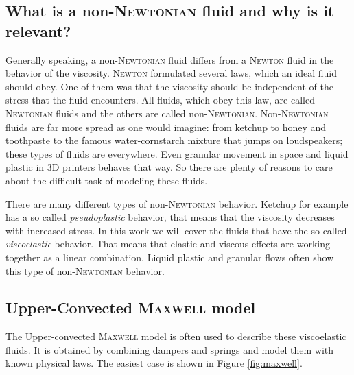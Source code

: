 \documentclass[12pt,a4paper,twoside, open=right]{scrreprt}
\theoremstyle{definition}
\theoremstyle{plain}
\begin{document}
\subsection{What is a non-\textsc{Newtonian} fluid and why is it relevant?}
Generally speaking, a non-\textsc{Newtonian} fluid differs from a \textsc{Newton} fluid in the behavior of the viscosity. \textsc{Newton} formulated several laws, which an ideal fluid should obey. One of them was that the viscosity should be independent of the stress that the fluid encounters. All fluids, which obey this law, are called \textsc{Newtonian} fluids and the others are called non-\textsc{Newtonian}. Non-\textsc{Newtonian} fluids are far more spread as one would imagine: from ketchup to honey and toothpaste to the famous water-cornstarch mixture that jumps on loudspeakers; these types of fluids are everywhere. Even granular movement in space and liquid plastic in 3D printers behaves that way. So there are plenty of reasons to care about the difficult task of modeling these fluids. \par 
There are many different types of non-\textsc{Newtonian} behavior. Ketchup for example has a so called \emph{pseudoplastic} behavior, that means that the viscosity decreases with increased stress. In this work we will cover the fluids that have the so-called \emph{viscoelastic} behavior. That means that elastic and viscous effects are working together as a linear combination. Liquid plastic and granular flows often show this type of non-\textsc{Newtonian} behavior.
\subsection{Upper-Convected \textsc{Maxwell} model}
The Upper-convected \textsc{Maxwell} model is often used to describe these viscoelastic fluids. It is obtained by combining dampers and springs and model them with known physical laws. The easiest case is shown in Figure \ref{fig:maxwell}.
\end{document}
